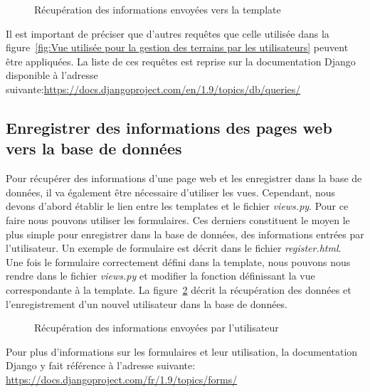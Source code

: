 
\begin{figure}[!ht]
\centering

\caption{Récupération des informations envoyées vers la template}
\label{fig:Récupération des informations envoyées vers la template}
\end{figure}
\FloatBarrier

Il est important de préciser que d'autres requêtes que celle utilisée dans la figure~\ref{fig:Vue utilisée pour la gestion des terrains par les utilisateurs} peuvent être appliquées. La liste de ces requêtes est reprise sur la documentation Django disponible à l'adresse suivante:\url{https://docs.djangoproject.com/en/1.9/topics/db/queries/}

\subsection{Enregistrer des informations des pages web vers la base de données}

Pour récupérer des informations d'une page web et les enregistrer dans la base de données, il va également être nécessaire d'utiliser les vues. Cependant, nous devons d'abord établir le lien entre les templates et le fichier \textit{views.py}. Pour ce faire nous pouvons utiliser les formulaires. Ces derniers constituent le moyen le plus simple pour enregistrer dans la base de données, des informations entrées par l'utilisateur. Un exemple de formulaire est décrit dans le fichier \textit{register.html}.\\

Une fois le formulaire correctement défini dans la template, nous pouvons nous rendre dans le fichier \textit{views.py} et modifier la fonction définissant la vue correspondante à la template. La figure~\ref{fig:Récupération des informations envoyées par l'utilisateur} décrit la récupération des données et l'enregistrement d'un nouvel utilisateur dans la base de données.


\begin{figure}[!ht]
\centering

\caption{Récupération des informations envoyées par l'utilisateur}
\label{fig:Récupération des informations envoyées par l'utilisateur}
\end{figure}
\FloatBarrier

Pour plus d'informations sur les formulaires et leur utilisation, la documentation Django y fait référence à l'adresse suivante: \url{https://docs.djangoproject.com/fr/1.9/topics/forms/}
